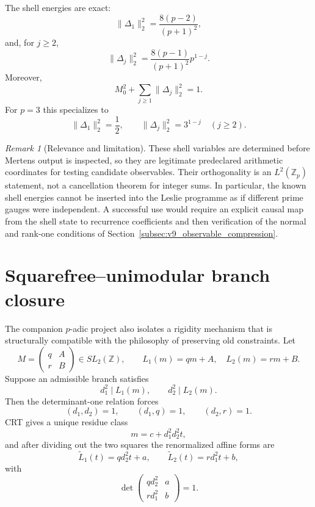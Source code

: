 \documentclass[11pt]{amsart}
\numberwithin{equation}{section}
\theoremstyle{plain}
\theoremstyle{definition}
\theoremstyle{remark}
\newtheorem{remark}[theorem]{Remark}
\begin{document}
The shell energies are exact:
\begin{equation}
\|\Delta_1\|_2^2
=
\frac{8(p-2)}{(p+1)^2},
\label{eq:v9_padic_first_energy}
\end{equation}
and, for $j\ge2$,
\begin{equation}
\boxed{
\|\Delta_j\|_2^2
=
\frac{8(p-1)}{(p+1)^2}p^{1-j}.
}
\label{eq:v9_padic_shell_energy}
\end{equation}
Moreover,
\begin{equation}
M_0^2+\sum_{j\ge1}\|\Delta_j\|_2^2=1.
\label{eq:v9_padic_energy_closure}
\end{equation}
For $p=3$ this specializes to
\[
\|\Delta_1\|_2^2=\frac12,
\qquad
\|\Delta_j\|_2^2=3^{1-j}\quad(j\ge2).
\]

\begin{remark}[Relevance and limitation]
\label{rem:v9_padic_relevance}
These shell variables are determined before Mertens output is inspected, so they are legitimate
predeclared arithmetic coordinates for testing candidate observables.  Their orthogonality is an
$L^2(\mathbb Z_p)$ statement, not a cancellation theorem for integer sums.  In particular, the
known shell energies cannot be inserted into the Leslie programme as if different prime gauges
were independent.  A successful use would require an explicit causal map from the shell state to
recurrence coefficients and then verification of the normal and rank-one conditions of
Section~\ref{subsec:v9_observable_compression}.
\end{remark}

\section{Squarefree--unimodular branch closure}
\label{sec:v9_squarefree_unimodular_import}

The companion $p$-adic project also isolates a rigidity mechanism that is structurally compatible
with the philosophy of preserving old constraints.  Let
\[
M=
\begin{pmatrix}
q&A\\
r&B
\end{pmatrix}
\in SL_2(\mathbb Z),
\qquad
L_1(m)=qm+A,\quad L_2(m)=rm+B.
\]
Suppose an admissible branch satisfies
\[
d_1^2\mid L_1(m),
\qquad
d_2^2\mid L_2(m).
\]
Then the determinant-one relation forces
\[
(d_1,d_2)=1,\qquad(d_1,q)=1,\qquad(d_2,r)=1.
\]
CRT gives a unique residue class
\[
m=c+d_1^2d_2^2t,
\]
and after dividing out the two squares the renormalized affine forms are
\begin{equation}
\widetilde L_1(t)=qd_2^2t+a,
\qquad
\widetilde L_2(t)=rd_1^2t+b,
\label{eq:v9_unimodular_renormalized_forms}
\end{equation}
with
\begin{equation}
\boxed{
\det
\begin{pmatrix}
qd_2^2&a\\
rd_1^2&b
\end{pmatrix}
=1.
}
\label{eq:v9_unimodular_branch_determinant}
\end{equation}
\end{document}

